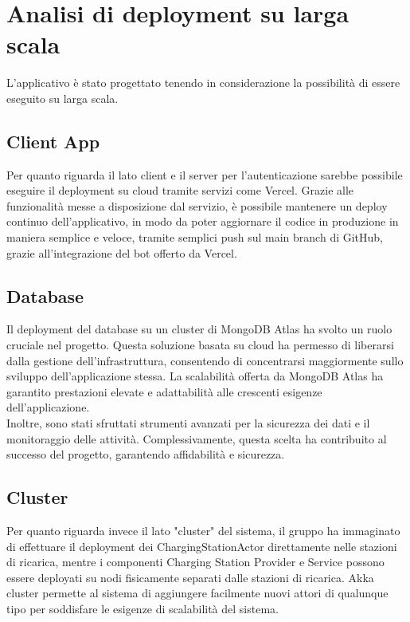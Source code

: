 

\section{Analisi di deployment su larga scala}

L'applicativo è stato progettato tenendo in considerazione la possibilità di essere eseguito su larga scala.\\

\subsection{Client App}
Per quanto riguarda il lato client e il server per l'autenticazione sarebbe possibile eseguire il deployment su cloud tramite servizi come Vercel.
Grazie alle funzionalità messe a disposizione dal servizio, è possibile mantenere un deploy continuo dell'applicativo,
in modo da poter aggiornare il codice in produzione in maniera semplice e veloce, tramite semplici push sul main branch di GitHub,
grazie all'integrazione del bot offerto da Vercel.\\

\subsection{Database}
Il deployment del database su un cluster di MongoDB Atlas ha svolto un ruolo cruciale nel progetto.
Questa soluzione basata su cloud ha permesso di liberarsi dalla gestione dell'infrastruttura, consentendo
di concentrarsi maggiormente sullo sviluppo dell'applicazione stessa. La scalabilità offerta da MongoDB
Atlas ha garantito prestazioni elevate e adattabilità alle crescenti esigenze dell'applicazione.\\

Inoltre, sono stati sfruttati strumenti avanzati per la sicurezza dei dati e il monitoraggio delle attività.
Complessivamente, questa scelta ha contribuito al successo del progetto, garantendo affidabilità e sicurezza.\\

\subsection{Cluster}
Per quanto riguarda invece il lato "cluster" del sistema, il gruppo ha immaginato di effettuare il deployment dei ChargingStationActor direttamente nelle stazioni di ricarica, mentre i
componenti Charging Station Provider e Service possono essere deployati su nodi fisicamente separati dalle stazioni di ricarica. Akka cluster permette al sistema di aggiungere facilmente
nuovi attori di qualunque tipo per soddisfare le esigenze di scalabilità del sistema.\\

